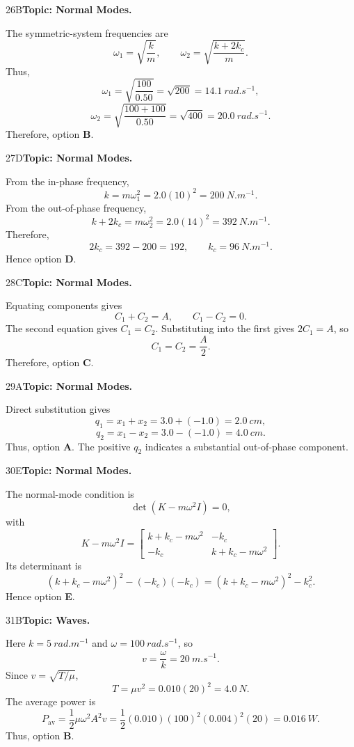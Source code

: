 \documentclass[10pt,a4paper]{physicsquiz}
\begin{document}
\begin{workedsolution}{26}{B}\textbf{Topic: Normal Modes.}\par The symmetric-system frequencies are
  \[
    \omega_1=\sqrt{\frac{k}{m}},\qquad
    \omega_2=\sqrt{\frac{k+2k_c}{m}}.
  \]
  Thus,
  \[
    \omega_1=\sqrt{\frac{100}{0.50}}=\sqrt{200}=\SI{14.1}{rad.s^{-1}},
  \]
  \[
    \omega_2=\sqrt{\frac{100+100}{0.50}}=\sqrt{400}=\SI{20.0}{rad.s^{-1}}.
  \]
  Therefore, option \textbf{B}.\end{workedsolution}
\begin{workedsolution}{27}{D}\textbf{Topic: Normal Modes.}\par From the in-phase frequency,
  \[
    k=m\omega_1^2=2.0{(10)}^2=\SI{200}{N.m^{-1}}.
  \]
  From the out-of-phase frequency,
  \[
    k+2k_c=m\omega_2^2=2.0{(14)}^2=\SI{392}{N.m^{-1}}.
  \]
  Therefore,
  \[
    2k_c=392-200=192,
    \qquad k_c=\SI{96}{N.m^{-1}}.
  \]
  Hence option \textbf{D}.\end{workedsolution}
\begin{workedsolution}{28}{C}\textbf{Topic: Normal Modes.}\par Equating components gives
  \[
    C_1+C_2=A,
    \qquad
    C_1-C_2=0.
  \]
  The second equation gives \(C_1=C_2\). Substituting into the first gives \(2C_1=A\), so
  \[
    C_1=C_2=\frac{A}{2}.
  \]
  Therefore, option \textbf{C}.\end{workedsolution}
\begin{workedsolution}{29}{A}\textbf{Topic: Normal Modes.}\par Direct substitution gives
  \[
    q_1=x_1+x_2=3.0+(-1.0)=\SI{2.0}{cm},
  \]
  \[
    q_2=x_1-x_2=3.0-(-1.0)=\SI{4.0}{cm}.
  \]
  Thus, option \textbf{A}. The positive \(q_2\) indicates a substantial out-of-phase component.\end{workedsolution}
\begin{workedsolution}{30}{E}\textbf{Topic: Normal Modes.}\par The normal-mode condition is
  \[
    \det(K-m\omega^2I)=0,
  \]
  with
  \[
    K-m\omega^2I=
    \begin{bmatrix}
      k+k_c-m\omega^2 & -k_c            \\
      -k_c            & k+k_c-m\omega^2
    \end{bmatrix}.
  \]
  Its determinant is
  \[
    {(k+k_c-m\omega^2)}^2-(-k_c)(-k_c)
    ={(k+k_c-m\omega^2)}^2-k_c^2.
  \]
  Hence option \textbf{E}.\end{workedsolution}
\begin{workedsolution}{31}{B}\textbf{Topic: Waves.}\par Here \(k=\SI{5}{rad.m^{-1}}\) and \(\omega=\SI{100}{rad.s^{-1}}\), so
  \[
    v=\frac{\omega}{k}=\SI{20}{m.s^{-1}}.
  \]
  Since \(v=\sqrt{T/\mu}\),
  \[
    T=\mu v^2=0.010{(20)}^2=\SI{4.0}{N}.
  \]
  The average power is
  \[
    P_{\mathrm{av}}=\frac12\mu\omega^2A^2v
    =\frac12{(0.010)}{(100)}^2{(0.004)}^2{(20)}
    =\SI{0.016}{W}.
  \]
  Thus, option \textbf{B}.\end{workedsolution}
\end{document}
